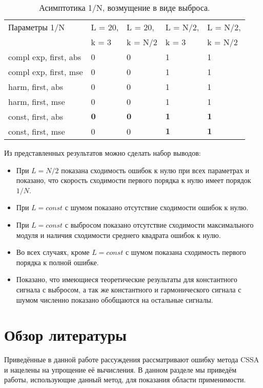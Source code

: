 \documentclass[specialist,
               substylefile = spbu.rtx,
               subf,href,colorlinks=true, 12pt]{disser}
\begin{document}
\begin{table}[H]
    \centering
    \caption{Асимптотика 1/N, возмущение в виде выброса.}
    \label{tab:conv_speed_outl}
    \begin{tabular}{|l|l|l|l|l|}
    \hline
        Параметры 1/N & L = 20, & L = 20, & L = N/2, & L = N/2, \\
        & k = 3 & k = N/2 & k = 3 & k = N/2 \\ \hline
        compl exp, first, abs & 0 & 0 & 1 & 1 \\ \hline
        compl exp, first, mse & 0 & 0 & 1 & 1 \\ \hline
        harm, first, abs & 0 & 0 & 1 & 1 \\ \hline
        harm, first, mse & 0 & 0 & 1 & 1 \\ \hline
        const, first, abs & $\mathbf{0}$ & $\mathbf{0}$ & $\mathbf{1}$ & $\mathbf{1}$ \\ \hline
        const, first, mse & 0 & 0 & $\mathbf{1}$ & $\mathbf{1}$ \\ \hline
    \end{tabular}
\end{table}

Из представленных результатов можно сделать набор выводов:
\begin{itemize}
        \item При $L = N/2$ показана сходимость ошибок к нулю при всех параметрах и показано, что скорость сходимости первого порядка к нулю имеет порядок $1/N$.
        \item При $L = const$ с шумом показано отсутствие сходимости ошибок к нулю.
        \item При $L = const$ с выбросом показано отсутствие сходимости максимального модуля и наличия сходимости среднего квадрата ошибок к нулю.
        \item Во всех случаях, кроме $L = const$ с шумом показана сходимость первого порядка к полной ошибке.
        \item Показано, что имеющиеся теоретические результаты для константного сигнала с выбросом, а так же константного и гармонического сигнала с шумом численно показано обобщаются на остальные сигналы.
    \end{itemize}

\section{Обзор литературы}

Приведённые в данной работе рассуждения рассматривают ошибку метода CSSA и нацелены на упрощение её вычисления. В данном разделе мы приведём работы, использующие данный метод, для показания области применимости.
\end{document}
